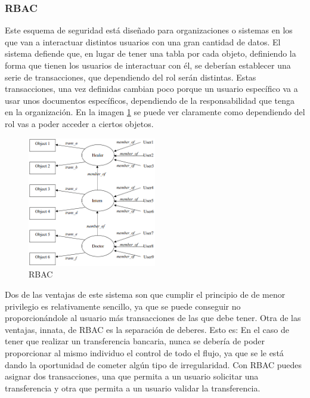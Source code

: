 \documentclass[titlepage, 12pt, a4paper]{article}
\begin{document}
\subsubsection{\Gls{RBAC}}
Este esquema de seguridad está diseñado para organizaciones o sistemas en los que van a interactuar distintos usuarios con una gran cantidad de datos. El sistema defiende que, en lugar de tener una tabla por cada objeto, definiendo la forma que tienen los usuarios de interactuar con él, se deberían establecer una serie de transacciones, que dependiendo del rol serán distintas. Estas transacciones, una vez definidas cambian poco porque un usuario específico va a usar unos documentos específicos, dependiendo de la responsabilidad que tenga en la organización. En la imagen \ref{fig:RBAC} se puede ver claramente como dependiendo del rol vas a poder acceder a ciertos objetos.
\begin{figure}[H]
    \centering
    \includegraphics[width=0.5\textwidth]{Media/RBAC.PNG}
    \caption{\Gls{RBAC}}
    \label{fig:RBAC}
\end{figure}
Dos de las ventajas de este sistema son que cumplir el principio de de menor privilegio es relativamente sencillo, ya que se puede conseguir no proporcionándole  al usuario más transacciones de las que debe tener. Otra de las ventajas, innata, de \Gls{RBAC} es la separación de deberes. Esto es: En el caso de tener que realizar un transferencia bancaria, nunca se debería de poder proporcionar al mismo individuo el control de todo el flujo, ya que se le está dando la oportunidad de cometer algún tipo de irregularidad. Con RBAC puedes asignar dos transacciones, una que permita a un usuario solicitar una transferencia y otra que permita a un usuario validar la transferencia.
\end{document}

